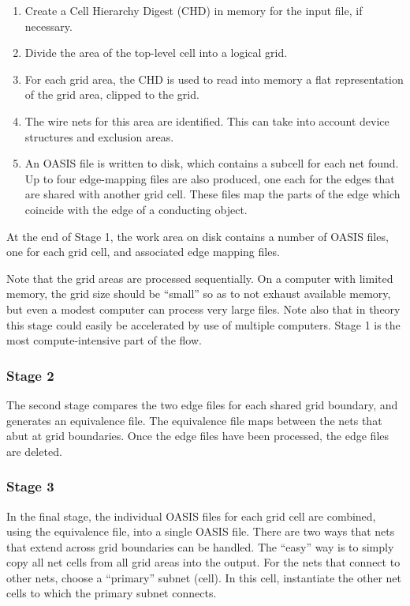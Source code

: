 \begin{enumerate}
\item{Create a Cell Hierarchy Digest (CHD) in memory for the input
file, if necessary.}

\item{Divide the area of the top-level cell into a logical grid.}

\item{For each grid area, the CHD is used to read into memory a flat
representation of the grid area, clipped to the grid.}

\item{The wire nets for this area are identified.  This can take
into account device structures and exclusion areas.}

\item{An OASIS file is written to disk, which contains a subcell for
each net found.  Up to four edge-mapping files are also produced,
one each for the edges that are shared with another grid cell.
These files map the parts of the edge which coincide with the edge
of a conducting object.}
\end{enumerate}

At the end of Stage 1, the work area on disk contains a number of
OASIS files, one for each grid cell, and associated edge mapping
files.

Note that the grid areas are processed sequentially.  On a computer
with limited memory, the grid size should be ``small'' so as to not
exhaust available memory, but even a modest computer can process very
large files.  Note also that in theory this stage could easily be
accelerated by use of multiple computers.  Stage 1 is the most
compute-intensive part of the flow.

\subsubsection{Stage 2}

The second stage compares the two edge files for each shared grid
boundary, and generates an equivalence file.  The equivalence file
maps between the nets that abut at grid boundaries.  Once the edge
files have been processed, the edge files are deleted.

\subsubsection{Stage 3}

In the final stage, the individual OASIS files for each grid cell are
combined, using the equivalence file, into a single OASIS file.  There
are two ways that nets that extend across grid boundaries can be
handled.  The ``easy'' way is to simply copy all net cells from all
grid areas into the output.  For the nets that connect to other nets,
choose a ``primary'' subnet (cell).  In this cell, instantiate the
other net cells to which the primary subnet connects.

